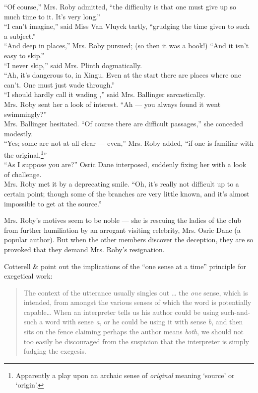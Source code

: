 \ea \label{ex:5.17}
“Of course,” Mrs. Roby admitted, “the difficulty is that one must give up so much time to it. It’s very long.”\\
“I can’t imagine,” said Miss Van Vluyck tartly, “grudging the time given to such a subject.”\\
“And deep in places,” Mrs. Roby pursued; (so then it was a book!) “And it isn’t easy to skip.”\\
“I never skip,” said Mrs. Plinth dogmatically.\\
“Ah, it’s dangerous to, in Xingu. Even at the start there are places where one can’t. One must just wade through.”\\
“I should hardly call it wading ,” said Mrs. Ballinger sarcastically.\\
Mrs. Roby sent her a look of interest. “Ah — you always found it went swimmingly?”\\
Mrs. Ballinger hesitated. “Of course there are difficult passages,” she conceded modestly.\\
“Yes; some are not at all clear — even,” Mrs. Roby added, “if one is familiar with the original.\footnote{Apparently a play upon an archaic sense of \textit{original} meaning ‘source’ or ‘origin’.}”\\
“As I suppose you are?” Osric Dane interposed, suddenly fixing her with a look of challenge.\\
Mrs. Roby met it by a deprecating smile. “Oh, it’s really not difficult up to a certain point; though some of the branches are very little known, and it’s almost impossible to get at the source.”
\z

Mrs. Roby’s motives seem to be noble — she is rescuing the ladies of the club from further humiliation by an arrogant visiting celebrity, Mrs. Osric Dane (a popular author). But when the other members discover the deception, they are so provoked that they demand Mrs. Roby’s resignation.

Cotterell \& \citet[175]{Turner1989} point out the implications of the “one sense at a time” principle for exegetical work:

\begin{quote}
The context of the utterance usually singles out … the \textit{one} sense, which is intended, from amongst the various senses of which the word is potentially capable…  When an interpreter tells us his author could be using such-and-such a word with sense \textit{a}, or he could be using it with sense \textit{b}, and then sits on the fence claiming perhaps the author means \textit{both}, we should not too easily be discouraged from the suspicion that the interpreter is simply fudging the exegesis.
\end{quote}


